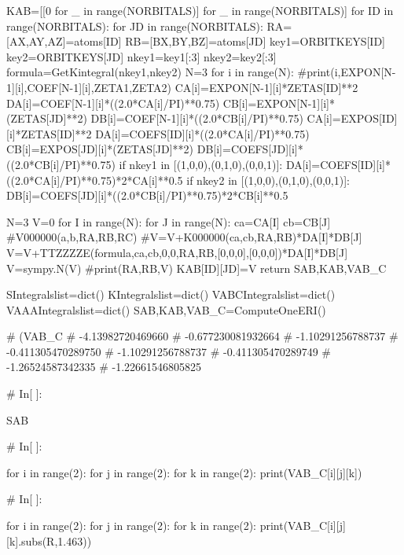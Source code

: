     KAB=[[0 for _ in range(NORBITALS)] for _  in range(NORBITALS)]              
    for ID in range(NORBITALS):
        for JD in range(NORBITALS):
            RA=[AX,AY,AZ]=atoms[ID]
            RB=[BX,BY,BZ]=atoms[JD]
            key1=ORBITKEYS[ID]
            key2=ORBITKEYS[JD]
            nkey1=key1[:3]
            nkey2=key2[:3]
            formula=GetKintegral(nkey1,nkey2)
            N=3
            for i in range(N):
                #print(i,EXPON[N-1][i],COEF[N-1][i],ZETA1,ZETA2)
                CA[i]=EXPON[N-1][i]*ZETAS[ID]**2
                DA[i]=COEF[N-1][i]*((2.0*CA[i]/PI)**0.75)
                CB[i]=EXPON[N-1][i]*(ZETAS[JD]**2)
                DB[i]=COEF[N-1][i]*((2.0*CB[i]/PI)**0.75)
                CA[i]=EXPOS[ID][i]*ZETAS[ID]**2
                DA[i]=COEFS[ID][i]*((2.0*CA[i]/PI)**0.75)
                CB[i]=EXPOS[JD][i]*(ZETAS[JD]**2)
                DB[i]=COEFS[JD][i]*((2.0*CB[i]/PI)**0.75)
                if nkey1 in [(1,0,0),(0,1,0),(0,0,1)]:
                    DA[i]=COEFS[ID][i]*((2.0*CA[i]/PI)**0.75)*2*CA[i]**0.5
                if nkey2 in [(1,0,0),(0,1,0),(0,0,1)]:
                    DB[i]=COEFS[JD][i]*((2.0*CB[i]/PI)**0.75)*2*CB[i]**0.5
            
            N=3
            V=0
            for I in range(N):            
                for J in range(N):
                            ca=CA[I]
                            cb=CB[J]
                            #V000000(a,b,RA,RB,RC)
                            #V=V+K000000(ca,cb,RA,RB)*DA[I]*DB[J]
                            V=V+TTZZZZE(formula,ca,cb,0,0,RA,RB,[0,0,0],[0,0,0])*DA[I]*DB[J]
            V=sympy.N(V)
            #print(RA,RB,V)
            KAB[ID][JD]=V
    return SAB,KAB,VAB_C

SIntegralslist=dict()
KIntegralslist=dict()
VABCIntegralslist=dict()
VAAAIntegralslist=dict()            
SAB,KAB,VAB_C=ComputeOneERI()


# (VAB_C
# -4.13982720469660
# -0.677230081932664
# -1.10291256788737
# -0.411305470289750
# -1.10291256788737
# -0.411305470289749
# -1.26524587342335
# -1.22661546805825

# In[ ]:


SAB


# In[ ]:


for i in range(2):
    for j in range(2):
        for k in range(2):
            print(VAB_C[i][j][k])


# In[ ]:


for i in range(2):
    for j in range(2):
        for k in range(2):
            print(VAB_C[i][j][k].subs(R,1.463))


